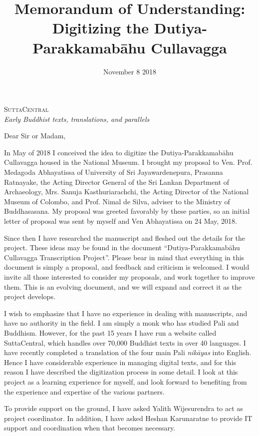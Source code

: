 \documentclass[11pt, openany,a4paper]{article}
\title{Memorandum of Understanding: Digitizing the Dutiya-Parakkamabāhu Cullavagga}
\author{}
\date{November 8 2018}
\begin{document}
\thispagestyle{empty}

\begin {center}


{\textsc{\huge SuttaCentral}}\\

\vspace{0.2em}
\textsf{\emph{Early Buddhist texts, translations, and parallels}}
\vspace{2em}

\end {center}

\noindent Dear Sir or Madam,

In May of 2018 I conceived the idea to digitize the Dutiya-Parakkamabāhu Cullavagga housed in the National Museum. I brought my proposal to Ven. Prof. Medagoda Abhayatissa of University of Sri Jayawardenepura, Prasanna Ratnayake, the Acting Director General of the Sri Lankan Department of Archaeology, Mrs. Sanuja Kasthuriarachchi, the Acting Director of the National Museum of Colombo, and Prof. Nimal de Silva, adviser to the Ministry of Buddhasasana. My proposal was greeted favorably by these parties, so an initial letter of proposal was sent by myself and Ven Abhayatissa on 24 May, 2018.

Since then I have researched the manuscript and fleshed out the details for the project. These ideas may be found in the document “Dutiya-Parakkamabāhu Cullavagga Transcription Project”. Please bear in mind that everything in this document is simply a proposal, and feedback and criticism is welcomed. I would invite all those interested to consider my proposals, and work together to improve them. This is an evolving document, and we will expand and correct it as the project develops.

I wish to emphasize that I have no experience in dealing with manuscripts, and have no authority in the field. I am simply a monk who has studied Pali and Buddhism. However, for the past 15 years I have run a website called SuttaCentral, which handles over 70,000 Buddhist texts in over 40 languages. I have recently completed a translation of the four main Pali \emph{nikāyas} into English. Hence I have considerable experience in managing digital texts, and for this reason I have described the digitization process in some detail. I look at this project as a learning experience for myself, and look forward to benefiting from the experience and expertise of the various partners.

To provide support on the ground, I have asked Yalith Wijesurendra to act as project coordinator. In addition, I have asked Heshan Karunaratne to provide IT support and coordination when that becomes necessary.
\end{document}
